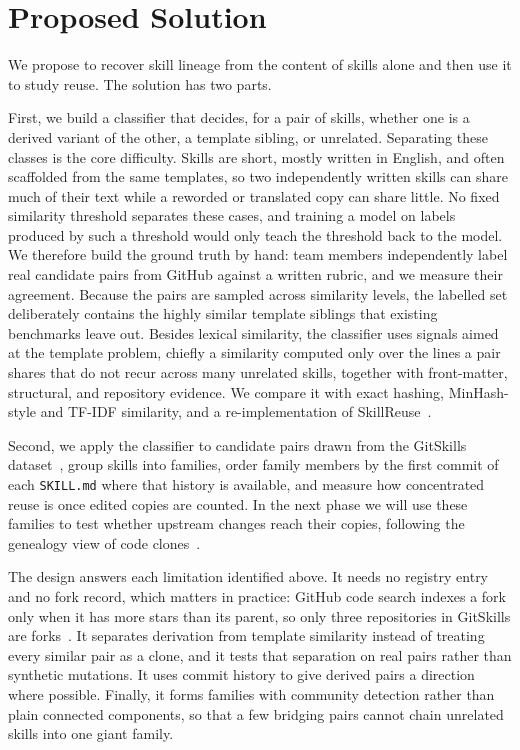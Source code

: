 \section{Proposed Solution}
\label{sec:solution}

We propose to recover skill lineage from the content of skills alone and then use it to
study reuse. The solution has two parts.

First, we build a classifier that decides, for a pair of skills, whether one is a derived
variant of the other, a template sibling, or unrelated. Separating these classes is the core
difficulty. Skills are short, mostly written in English, and often scaffolded from the same
templates, so two independently written skills can share much of their text while a reworded
or translated copy can share little. No fixed similarity threshold separates these cases, and
training a model on labels produced by such a threshold would only teach the threshold back to
the model. We therefore build the ground truth by hand: team members independently label real
candidate pairs from GitHub against a written rubric, and we measure their agreement. Because
the pairs are sampled across similarity levels, the labelled set deliberately contains the
highly similar template siblings that existing benchmarks leave out. Besides lexical
similarity, the classifier uses signals aimed at the template problem, chiefly a similarity
computed only over the lines a pair shares that do not recur across many unrelated skills,
together with front-matter, structural, and repository evidence. We compare it with exact
hashing, MinHash-style and TF-IDF similarity, and a re-implementation of
SkillReuse~\cite{zhu2026skillreuse}.

Second, we apply the classifier to candidate pairs drawn from the GitSkills
dataset~\cite{destefanis2027gitskills}, group skills into families, order family members by
the first commit of each \texttt{SKILL.md} where that history is available, and measure how
concentrated reuse is once edited copies are counted. In the next phase we will use these
families to test whether upstream changes reach their copies, following the genealogy view of
code clones~\cite{kim2005genealogy}.

The design answers each limitation identified above. It needs no registry entry and no fork
record, which matters in practice: GitHub code search indexes a fork only when it has more
stars than its parent, so only three repositories in GitSkills are
forks~\cite{gitskills_sample}. It separates derivation from template similarity instead of
treating every similar pair as a clone, and it tests that separation on real pairs rather than
synthetic mutations. It uses commit history to give derived pairs a direction where possible.
Finally, it forms families with community detection rather than plain connected components,
so that a few bridging pairs cannot chain unrelated skills into one giant family.
